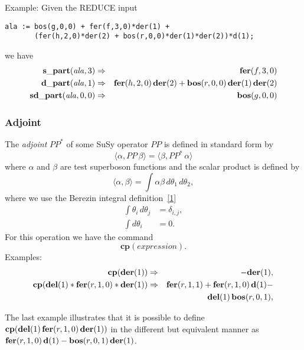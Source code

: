 {Example: Given the REDUCE input
\begin{verbatim}
ala := bos(g,0,0) + fer(f,3,0)*der(1) +
       (fer(h,2,0)*der(2) + bos(r,0,0)*der(1)*der(2))*d(1);
\end{verbatim}
we have
\begin{eqnarray*}
  \mathbf{s\_part}(\mathit{ala},3) &\Rightarrow& \mathbf{fer}(f,3,0) \\
  \mathbf{d\_part}(\mathit{ala},1) &\Rightarrow& \mathbf{fer}(h,2,0)\,\mathbf{der}(2) +
  \mathbf{bos}(r,0,0)\,\mathbf{der}(1)\,\mathbf{der}(2) \\
  \mathbf{sd\_part}(\mathit{ala},0,0) &\Rightarrow& \mathbf{bos}(g,0,0)
\end{eqnarray*}

\subsubsection*{Adjoint}

The \emph{adjoint} $\mathit{PP}^*$ of some SuSy operator $\mathit{PP}$
is defined in standard form by
\begin{equation*}
  \langle \alpha, \mathit{PP}\,\beta \rangle =
  \langle \beta, \mathit{PP}^*\,\alpha \rangle
\end{equation*}
where $\alpha$ and $\beta$ are test superboson functions and the
scalar product is defined by
\begin{equation*}
  \langle \alpha, \beta \rangle =
  \int \alpha \beta\,d\theta_{1}\,d\theta_{2},
\end{equation*}
where we use the Berezin integral definition~\hyperref[susy2-bib]{[1]}
\begin{align*}
  \int \theta_{i}\,d\theta_{j} &= \delta_{i,j}, \\
  \int d\theta_{i} &= 0.
\end{align*}
For this operation we have the command
\begin{equation*}
  \mathbf{cp}(\mathit{expression}).
\end{equation*}
Examples:
\begin{eqnarray*}
  \mathbf{cp}(\mathbf{der}(1)) &\Rightarrow& -\mathbf{der}(1), \\
  \mathbf{cp}(\mathbf{del}(1)*\mathbf{fer}(r,1,0)*\mathbf{der}(1)) &\Rightarrow&
  \mathbf{fer}(r,1,1) + \mathbf{fer}(r,1,0)\,\mathbf{d}(1) - \\
  && \mathbf{del}(1)\,\mathbf{bos}(r,0,1),
\end{eqnarray*}

The last example illustrates that it is possible to define
$\mathbf{cp}(\mathbf{del}(1)\,\mathbf{fer}(r,1,0)\,\mathbf{der}(1))$ in the different but
equivalent manner as $\mathbf{fer}(r,1,0)\,\mathbf{d}(1) - \mathbf{bos}(r,0,1)\,\mathbf{der}(1)$.

}
